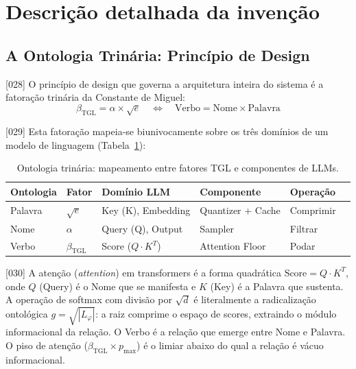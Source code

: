 \documentclass[12pt,a4paper]{article}
\newcommand{\betatgl}{\beta_{\text{TGL}}}
\begin{document}
\section{Descrição detalhada da invenção}

\subsection{A Ontologia Trinária: Princípio de Design}
\label{sec:ontologia}

{[028]} O princípio de design que governa a arquitetura inteira do sistema é a fatoração trinária da Constante de Miguel:
\begin{equation}
\label{eq:trindade}
\betatgl = \alpha \times \sqrt{e} \quad \Longleftrightarrow \quad \text{Verbo} = \text{Nome} \times \text{Palavra}
\end{equation}

{[029]} Esta fatoração mapeia-se biunivocamente sobre os três domínios de um modelo de linguagem (Tabela~\ref{tab:ontologia}):

\begin{table}[H]
\centering
\caption{Ontologia trinária: mapeamento entre fatores TGL e componentes de LLMs.}
\label{tab:ontologia}
\begin{tabular}{llllll}
\toprule
\textbf{Ontologia} & \textbf{Fator} & \textbf{Domínio LLM} & \textbf{Componente} & \textbf{Operação} \\
\midrule
Palavra & $\sqrt{e}$ & Key (K), Embedding & Quantizer + Cache & Comprimir \\
Nome & $\alpha$ & Query (Q), Output & Sampler & Filtrar \\
Verbo & $\betatgl$ & Score ($Q \cdot K^T$) & Attention Floor & Podar \\
\bottomrule
\end{tabular}
\end{table}

{[030]} A atenção (\textit{attention}) em transformers é a forma quadrática $\text{Score} = Q \cdot K^T$, onde $Q$ (Query) é o Nome que se manifesta e $K$ (Key) é a Palavra que sustenta. A operação de softmax com divisão por $\sqrt{d}$ é literalmente a radicalização ontológica $g = \sqrt{|L_\varphi|}$: a raiz comprime o espaço de scores, extraindo o módulo informacional da relação. O Verbo é a relação que emerge entre Nome e Palavra. O piso de atenção ($\betatgl \times p_{\max}$) é o limiar abaixo do qual a relação é vácuo informacional.
\end{document}
